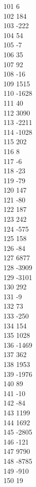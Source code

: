 { 101	6 \\
 102	184 \\
 103	-222 \\
 104	54 \\
 105	-7 \\
 106	35 \\
 107	92 \\
 108	-16 \\
 109	1515 \\
 110	-1628 \\
 111	40 \\
 112	3090 \\
 113	-2211 \\
 114	-1028 \\
 115	202 \\
 116	8 \\
 117	-6 \\
 118	-23 \\
 119	-79 \\
 120	147 \\
 121	-80 \\
 122	187 \\
 123	242 \\
 124	-575 \\
 125	158 \\
 126	-84 \\
 127	6877 \\
 128	-3909 \\
 129	-3101 \\
 130	292 \\
 131	-9 \\
 132	73 \\
 133	-250 \\
 134	154 \\
 135	1028 \\
 136	-1469 \\
 137	362 \\
 138	1953 \\
 139	-1976 \\
 140	89 \\
 141	-10 \\
 142	-84 \\
 143	1199 \\
 144	1692 \\
 145	-2805 \\
 146	-121 \\
 147	9790 \\
 148	-8785 \\
 149	-910 \\
 150	19 \\
}
